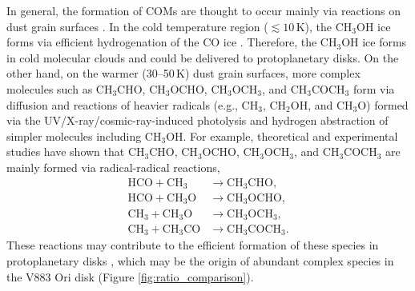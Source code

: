 \documentclass[linenumbers, twocolumn, twocolappendix, astrosymb, times]{aastex631}
\newcommand{\methanol}{CH$_3$OH\xspace}
\newcommand{\acetaldehyde}{CH$_3$CHO\xspace}
\newcommand{\methylformate}{CH$_3$OCHO\xspace}
\newcommand{\dimethylether}{CH$_3$OCH$_3$\xspace}
\newcommand{\acetone}{CH$_3$COCH$_3$\xspace}
\begin{document}
In general, the formation of COMs are thought to occur mainly via reactions on dust grain surfaces \citep[][and references therein]{Herbst2009}. In the cold temperature region ($\lesssim 10$\,K), the \methanol ice forms via efficient hydrogenation of the CO ice \citep[e.g.,][]{Tielens1982, Watanabe2002, Watanabe2003}. Therefore, the \methanol ice forms in cold molecular clouds and could be delivered to protoplanetary disks. On the other hand, on the warmer (30--50\,K) dust grain surfaces, more complex molecules such as \acetaldehyde, \methylformate, \dimethylether, and \acetone form via diffusion and reactions of heavier radicals (e.g., CH$_3$, CH$_2$OH, and CH$_3$O) formed via the UV/X-ray/cosmic-ray-induced photolysis and hydrogen abstraction of simpler molecules including \methanol \citep[e.g.,][]{Garrod2006, Garrod2013, Oberg2009, Walsh2014, Furuya2014, Notsu2021, Notsu2022}. For example, theoretical and experimental studies \citep[e.g.,][]{Garrod2006, Chuang2016} have shown that \acetaldehyde, \methylformate, \dimethylether, and \acetone are mainly formed via radical-radical reactions,
\begin{align}
    \mathrm{HCO} + \mathrm{CH_3} &\longrightarrow \mathrm{CH_3CHO}, \label{eq:r-r_reaction1} \\ 
    \mathrm{HCO} + \mathrm{CH_3O} &\longrightarrow \mathrm{CH_3OCHO}, \label{eq:r-r_reaction2} \\
    \mathrm{CH_3} + \mathrm{CH_3O} &\longrightarrow \mathrm{CH_3OCH_3}, \label{eq:r-r_reaction3} \\
    \mathrm{CH_3} + \mathrm{CH_3CO} &\longrightarrow \mathrm{CH_3COCH_3}. \label{eq:r-r_reaction4}
\end{align}
These reactions may contribute to the efficient formation of these species in protoplanetary disks \citep{Walsh2014, Furuya2014}, which may be the origin of abundant complex species in the V883 Ori disk (Figure \ref{fig:ratio_comparison}).


\end{document}
